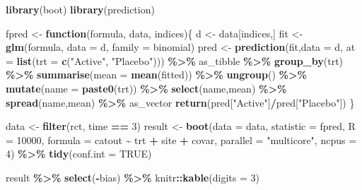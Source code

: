 \documentclass[
]{book}
\newenvironment{Shaded}{\begin{snugshade}}{\end{snugshade}}
\newcommand{\AttributeTok}[1]{\textcolor[rgb]{0.13,0.29,0.53}{#1}}
\newcommand{\ConstantTok}[1]{\textcolor[rgb]{0.56,0.35,0.01}{#1}}
\newcommand{\ControlFlowTok}[1]{\textcolor[rgb]{0.13,0.29,0.53}{\textbf{#1}}}
\newcommand{\DecValTok}[1]{\textcolor[rgb]{0.00,0.00,0.81}{#1}}
\newcommand{\FunctionTok}[1]{\textcolor[rgb]{0.13,0.29,0.53}{\textbf{#1}}}
\newcommand{\NormalTok}[1]{#1}
\newcommand{\OtherTok}[1]{\textcolor[rgb]{0.56,0.35,0.01}{#1}}
\newcommand{\SpecialCharTok}[1]{\textcolor[rgb]{0.81,0.36,0.00}{\textbf{#1}}}
\newcommand{\StringTok}[1]{\textcolor[rgb]{0.31,0.60,0.02}{#1}}
\begin{document}
\begin{Shaded}
\begin{Highlighting}[]
\FunctionTok{library}\NormalTok{(boot)}
\FunctionTok{library}\NormalTok{(prediction)}


\NormalTok{ fpred }\OtherTok{\textless{}{-}} \ControlFlowTok{function}\NormalTok{(formula, data, indices)\{}
\NormalTok{   d }\OtherTok{\textless{}{-}}\NormalTok{ data[indices,]}
\NormalTok{   fit }\OtherTok{\textless{}{-}} \FunctionTok{glm}\NormalTok{(formula, }\AttributeTok{data =}\NormalTok{ d, }\AttributeTok{family =}\NormalTok{ binomial)}
\NormalTok{   pred }\OtherTok{\textless{}{-}} \FunctionTok{prediction}\NormalTok{(fit,}\AttributeTok{data =}\NormalTok{ d, }\AttributeTok{at =} \FunctionTok{list}\NormalTok{(}\AttributeTok{trt =} \FunctionTok{c}\NormalTok{(}\StringTok{"Active"}\NormalTok{, }\StringTok{"Placebo"}\NormalTok{))) }\SpecialCharTok{\%\textgreater{}\%}
\NormalTok{     as\_tibble }\SpecialCharTok{\%\textgreater{}\%}
     \FunctionTok{group\_by}\NormalTok{(trt) }\SpecialCharTok{\%\textgreater{}\%}
     \FunctionTok{summarise}\NormalTok{(}\AttributeTok{mean =} \FunctionTok{mean}\NormalTok{(fitted)) }\SpecialCharTok{\%\textgreater{}\%}
     \FunctionTok{ungroup}\NormalTok{() }\SpecialCharTok{\%\textgreater{}\%}
     \FunctionTok{mutate}\NormalTok{(}\AttributeTok{name =} \FunctionTok{paste0}\NormalTok{(trt)) }\SpecialCharTok{\%\textgreater{}\%}
     \FunctionTok{select}\NormalTok{(name,mean) }\SpecialCharTok{\%\textgreater{}\%}
     \FunctionTok{spread}\NormalTok{(name,mean) }\SpecialCharTok{\%\textgreater{}\%}
\NormalTok{     as\_vector}
   \FunctionTok{return}\NormalTok{(pred[}\StringTok{"Active"}\NormalTok{]}\SpecialCharTok{/}\NormalTok{pred[}\StringTok{"Placebo"}\NormalTok{])}
\NormalTok{ \}}
 
\NormalTok{ data }\OtherTok{\textless{}{-}} \FunctionTok{filter}\NormalTok{(rct, time }\SpecialCharTok{==} \DecValTok{3}\NormalTok{)}
\NormalTok{ result }\OtherTok{\textless{}{-}} \FunctionTok{boot}\NormalTok{(}\AttributeTok{data =}\NormalTok{ data, }
                \AttributeTok{statistic =}\NormalTok{ fpred, }
                \AttributeTok{R =} \DecValTok{10000}\NormalTok{, }
                \AttributeTok{formula =}\NormalTok{ catout }\SpecialCharTok{\textasciitilde{}}\NormalTok{ trt }\SpecialCharTok{+}\NormalTok{ site }\SpecialCharTok{+}\NormalTok{ covar,}
                \AttributeTok{parallel =} \StringTok{"multicore"}\NormalTok{,}
                \AttributeTok{ncpus =} \DecValTok{4}\NormalTok{) }\SpecialCharTok{\%\textgreater{}\%}
   \FunctionTok{tidy}\NormalTok{(}\AttributeTok{conf.int =} \ConstantTok{TRUE}\NormalTok{) }
 
\NormalTok{ result }\SpecialCharTok{\%\textgreater{}\%}
   \FunctionTok{select}\NormalTok{(}\SpecialCharTok{{-}}\NormalTok{bias) }\SpecialCharTok{\%\textgreater{}\%}
\NormalTok{   knitr}\SpecialCharTok{::}\FunctionTok{kable}\NormalTok{(}\AttributeTok{digits =} \DecValTok{3}\NormalTok{)}
\end{Highlighting}
\end{Shaded}
\end{document}
